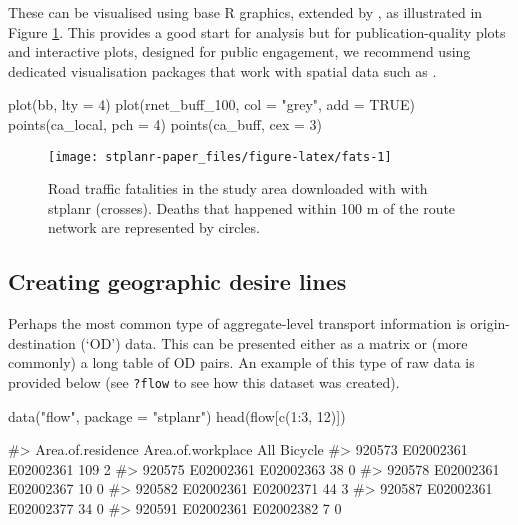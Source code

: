 These can be visualised using base R graphics, extended by ,
as illustrated in Figure \ref{fig:fats}. This provides a good start for
analysis but for publication-quality plots and interactive plots,
designed for public engagement, we recommend using dedicated
visualisation packages that work with spatial data such as
.

\begin{Schunk}
\begin{Sinput}
plot(bb, lty = 4)
plot(rnet_buff_100, col = "grey", add = TRUE)
points(ca_local, pch = 4)
points(ca_buff, cex = 3)
\end{Sinput}
\begin{figure}

{\centering \texttt{[image: stplanr-paper\_files/figure-latex/fats-1]} 

}

\caption[Road traffic fatalities in the study area downloaded with with stplanr (crosses)]{Road traffic fatalities in the study area downloaded with with stplanr (crosses). Deaths that happened within 100 m of the route network are represented by circles.}\label{fig:fats}
\end{figure}
\end{Schunk}

\subsection{Creating geographic desire
lines}\label{creating-geographic-desire-lines}

Perhaps the most common type of aggregate-level transport information is
origin-destination (`OD') data. This can be presented either as a matrix
or (more commonly) a long table of OD pairs. An example of this type of
raw data is provided below (see \texttt{?flow} to see how this dataset
was created).

\begin{Schunk}
\begin{Sinput}
data("flow", package = "stplanr")
head(flow[c(1:3, 12)])
\end{Sinput}
\begin{Soutput}
#>        Area.of.residence Area.of.workplace All Bicycle
#> 920573         E02002361         E02002361 109       2
#> 920575         E02002361         E02002363  38       0
#> 920578         E02002361         E02002367  10       0
#> 920582         E02002361         E02002371  44       3
#> 920587         E02002361         E02002377  34       0
#> 920591         E02002361         E02002382   7       0
\end{Soutput}
\end{Schunk}

